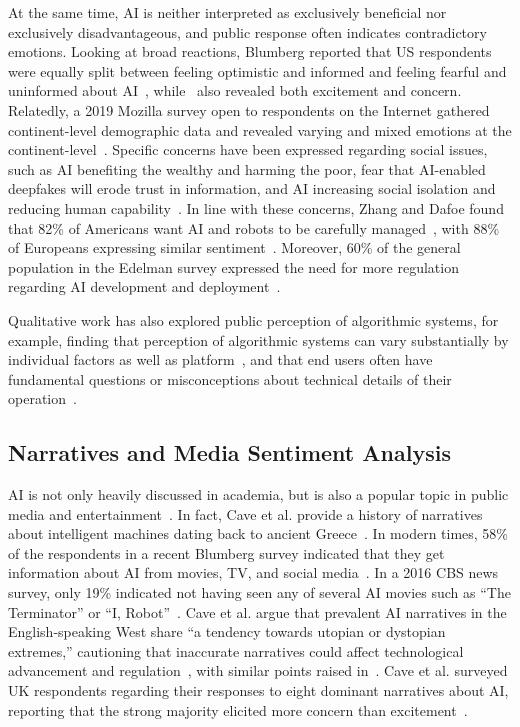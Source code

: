 \documentclass[11pt]{article} %
\begin{document}
At the same time, AI is neither interpreted as exclusively beneficial nor exclusively disadvantageous, and public response often indicates contradictory emotions. Looking at broad reactions, Blumberg reported that US respondents were equally split between feeling optimistic and informed and feeling fearful and uninformed about AI~\cite{blumberg2019}, while~\cite{arm2017} also revealed both excitement and concern. Relatedly, a 2019 Mozilla survey open to respondents on the Internet gathered continent-level demographic data and revealed varying and mixed emotions at the continent-level~\cite{mozilla2019}. Specific concerns have been expressed regarding social issues, such as AI benefiting the wealthy and harming the poor, fear that AI-enabled deepfakes will erode trust in information, and AI increasing social isolation and reducing human capability~\cite{edelman2019}. In line with these concerns, Zhang and Dafoe found that 82\% of Americans want AI and robots to be carefully managed~\cite{zhang2019artificial}, with 88\% of Europeans expressing similar sentiment~\cite{european2017}. Moreover, 60\% of the general population in the Edelman survey expressed the need for more regulation regarding AI development and deployment~\cite{edelman2019}.

Qualitative work has also explored public perception of algorithmic systems, for example, finding that perception of algorithmic systems can vary substantially by individual factors as well as platform~\cite{devito2017platforms}, and that end users often have fundamental questions or misconceptions about technical details of their operation~\cite{bucher2017algorithmic, eslami2015always, rader2015understanding, ur2012smart, warshaw2016intuitions}.

\subsection{Narratives and Media Sentiment Analysis}
AI is not only heavily discussed in academia, but is also a popular topic in public media and entertainment~\cite{edelman2019}. In fact, Cave et al. provide a history of narratives about intelligent machines dating back to ancient Greece~\cite{cave2020narratives}. In modern times, 58\% of the respondents in a recent Blumberg survey indicated that they get information about AI from movies, TV, and social media~\cite{blumberg2019}. In a 2016 CBS news survey, only 19\% indicated not having seen any of several AI movies such as ``The Terminator'' or ``I, Robot''~\cite{cbs2016}. Cave et al. argue that prevalent AI narratives in the English-speaking West share ``a tendency towards utopian or dystopian extremes,'' cautioning that inaccurate narratives could affect technological advancement and regulation~\cite{cave2018portrayals}, with similar points raised in~\cite{horvitz2012interim, stone2016artificial, you2015}. Cave et al. surveyed UK respondents regarding their responses to eight dominant narratives about AI, reporting that the strong majority elicited more concern than excitement~\cite{cave2019}.
\end{document}
